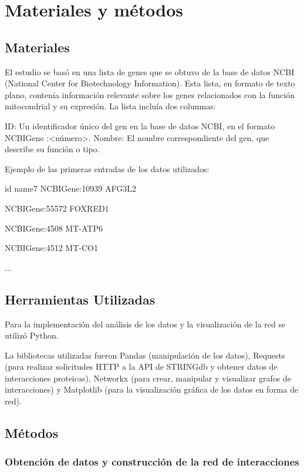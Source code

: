 \section{Materiales y métodos}


\subsection{\textbf{Materiales}}

El estudio se basó en una lista de genes que se obtuvo de la base de datos NCBI (National Center for Biotechnology Information). Esta lista, en formato de texto plano, contenía información relevante sobre los genes relacionados con la función mitocondrial y su expresión. La lista incluía dos columnas:

ID: Un identificador único del gen en la base de datos NCBI, en el formato NCBIGene :<número>.
Nombre: El nombre correspondiente del gen, que describe su función o tipo.

Ejemplo de las primeras entradas de los datos utilizados:

id                  name7
NCBIGene:10939      AFG3L2

NCBIGene:55572      FOXRED1

NCBIGene:4508       MT-ATP6

NCBIGene:4512       MT-CO1

...


\subsection{\textbf{Herramientas Utilizadas}}

Para la implementación del análisis de los datos y la visualización de la red se utilizó Python.

La bibliotecas utilizadas fueron Pandas (manipulación de los datos), Requests (para realizar solicitudes HTTP a la API de STRINGdb y obtener datos de interacciones proteicas), Networkx (para crear, manipular y visualizar grafos de interacciones) y Matplotlib (para la visualización gráfica de los datos en forma de red).



\subsection{\textbf{Métodos}}


\subsubsection{\textbf{Obtención de datos y construcción de la red de interacciones}}

